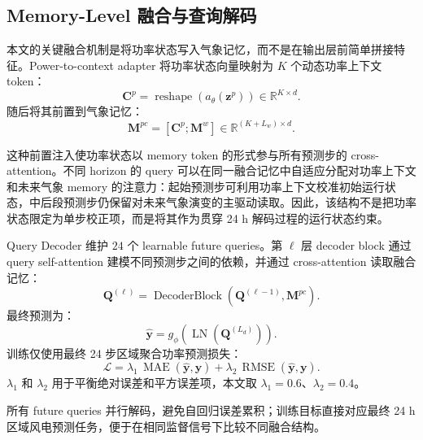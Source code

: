 
\subsection{Memory-Level 融合与查询解码}

本文的关键融合机制是将功率状态写入气象记忆，而不是在输出层前简单拼接特征。Power-to-context adapter 将功率状态向量映射为 \(K\) 个动态功率上下文 token：
\begin{equation}
\mathbf{C}^{p}=\operatorname{reshape}(a_{\theta}(\mathbf{z}^{p}))\in\mathbb{R}^{K\times d}.
\end{equation}
随后将其前置到气象记忆：
\begin{equation}
\mathbf{M}^{pc}=[\mathbf{C}^{p};\mathbf{M}^{w}]\in\mathbb{R}^{(K+L_w)\times d}.
\end{equation}

这种前置注入使功率状态以 memory token 的形式参与所有预测步的 cross-attention。不同 horizon 的 query 可以在同一融合记忆中自适应分配对功率上下文和未来气象 memory 的注意力：起始预测步可利用功率上下文校准初始运行状态，中后段预测步仍保留对未来气象演变的主驱动读取。因此，该结构不是把功率状态限定为单步校正项，而是将其作为贯穿 24 h 解码过程的运行状态约束。

Query Decoder 维护 \(24\) 个 learnable future queries。第 \(\ell\) 层 decoder block 通过 query self-attention 建模不同预测步之间的依赖，并通过 cross-attention 读取融合记忆：
\begin{equation}
\mathbf{Q}^{(\ell)}=\operatorname{DecoderBlock}(\mathbf{Q}^{(\ell-1)},\mathbf{M}^{pc}).
\end{equation}
最终预测为：
\begin{equation}
\hat{\mathbf{y}}=g_{\phi}(\operatorname{LN}(\mathbf{Q}^{(L_d)})).
\end{equation}
训练仅使用最终 24 步区域聚合功率预测损失：
\begin{equation}
\mathcal{L}=\lambda_1\,\operatorname{MAE}(\hat{\mathbf{y}},\mathbf{y})
+\lambda_2\,\operatorname{RMSE}(\hat{\mathbf{y}},\mathbf{y}).
\end{equation}
\(\lambda_1\) 和 \(\lambda_2\) 用于平衡绝对误差和平方误差项，本文取 \(\lambda_1=0.6\)、\(\lambda_2=0.4\)。

所有 future queries 并行解码，避免自回归误差累积；训练目标直接对应最终 24 h 区域风电预测任务，便于在相同监督信号下比较不同融合结构。
